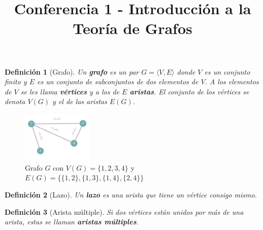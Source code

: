 \documentclass[a4paper,1pt]{report}
\title{Conferencia 1 - Introducci\'on a la Teor\'ia de Grafos}
\author{}
\newtheorem*{dfn}{Definición}
\begin{document}
\maketitle


\begin{dfn}[Grafo]
    Un \textbf{grafo} es un par $G = \langle V, E \rangle $ donde $V$ es un conjunto finito y $E$ es un conjunto de subconjuntos de dos elementos de $V$. A los elementos de $V$ se les llama \textbf{vértices} y a los de $E$ \textbf{aristas}. El conjunto de los vértices se denota $V(G)$ y el de las aristas $E(G)$.
\end{dfn}

\begin{figure}[htb]
\centering
\includegraphics[width=0.3\textwidth]{figures/grafo.png}
\caption{Grafo $G$ con $V(G) = \{1,2,3,4\}$ y $E(G) = \{\{1,2\}, \{1,3\}, \{1,4\}, \{2,4\} \}$}
\end{figure} 

\begin{dfn}[Lazo]
    Un \textbf{lazo} es una arista que tiene un v\'ertice consigo mismo.
\end{dfn}

\begin{dfn}[Arista m\'ultiple]
   Si dos vértices están unidos por más de una arista, estas se llaman \textbf{aristas
    múltiples}.
\end{dfn}
\end{document}
